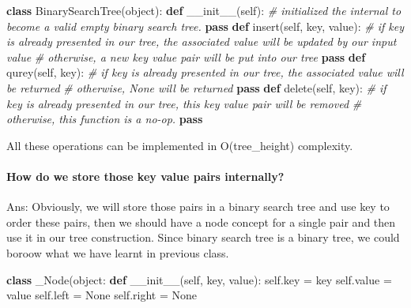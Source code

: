 \documentclass[11pt]{article}
\newenvironment{Shaded}{}{}
\newcommand{\KeywordTok}[1]{\textcolor[rgb]{0.00,0.44,0.13}{\textbf{{#1}}}}
\newcommand{\CommentTok}[1]{\textcolor[rgb]{0.38,0.63,0.69}{\textit{{#1}}}}
\newcommand{\FunctionTok}[1]{\textcolor[rgb]{0.02,0.16,0.49}{{#1}}}
\newcommand{\NormalTok}[1]{{#1}}
\newcommand{\VariableTok}[1]{\textcolor[rgb]{0.10,0.09,0.49}{{#1}}}
\newcommand{\ControlFlowTok}[1]{\textcolor[rgb]{0.00,0.44,0.13}{\textbf{{#1}}}}
\newcommand{\OperatorTok}[1]{\textcolor[rgb]{0.40,0.40,0.40}{{#1}}}
\newcommand{\BuiltInTok}[1]{{#1}}
\begin{document}
\begin{Shaded}
\begin{Highlighting}[]
\KeywordTok{class}\NormalTok{ BinarySearchTree(}\BuiltInTok{object}\NormalTok{):}
    \KeywordTok{def} \FunctionTok{__init__}\NormalTok{(}\VariableTok{self}\NormalTok{):}
        \CommentTok{# initialized the internal to become a valid empty binary search tree.}
        \ControlFlowTok{pass}
    \KeywordTok{def}\NormalTok{ insert(}\VariableTok{self}\NormalTok{, key, value):}
        \CommentTok{# if key is already presented in our tree, the associated value will be updated by our input value}
        \CommentTok{# otherwise, a new key value pair will be put into our tree}
        \ControlFlowTok{pass}
    \KeywordTok{def}\NormalTok{ qurey(}\VariableTok{self}\NormalTok{, key):}
        \CommentTok{# if key is already presented in our tree, the associated value will be returned}
        \CommentTok{# otherwise, None will be returned}
        \ControlFlowTok{pass}
    \KeywordTok{def}\NormalTok{ delete(}\VariableTok{self}\NormalTok{, key):}
        \CommentTok{# if key is already presented in our tree, this key value pair will be removed}
        \CommentTok{# otherwise, this function is a no-op.}
        \ControlFlowTok{pass}
\end{Highlighting}
\end{Shaded}

All these operations can be implemented in O(tree\_height) complexity.

    \paragraph{How do we store those key value pairs
internally?}\label{how-do-we-store-those-key-value-pairs-internally}

Ans: Obviously, we will store those pairs in a binary search tree and
use key to order these pairs, then we should have a node concept for a
single pair and then use it in our tree construction. Since binary
search tree is a binary tree, we could boroow what we have learnt in
previous class.

\begin{Shaded}
\begin{Highlighting}[]
\KeywordTok{class}\NormalTok{ _Node(}\BuiltInTok{object}\NormalTok{:}
    \KeywordTok{def} \FunctionTok{__init__}\NormalTok{(}\VariableTok{self}\NormalTok{, key, value):}
        \VariableTok{self}\NormalTok{.key }\OperatorTok{=}\NormalTok{ key}
        \VariableTok{self}\NormalTok{.value }\OperatorTok{=}\NormalTok{ value}
        \VariableTok{self}\NormalTok{.left }\OperatorTok{=} \VariableTok{None}
        \VariableTok{self}\NormalTok{.right }\OperatorTok{=} \VariableTok{None}
\end{Highlighting}
\end{Shaded}
\end{document}
